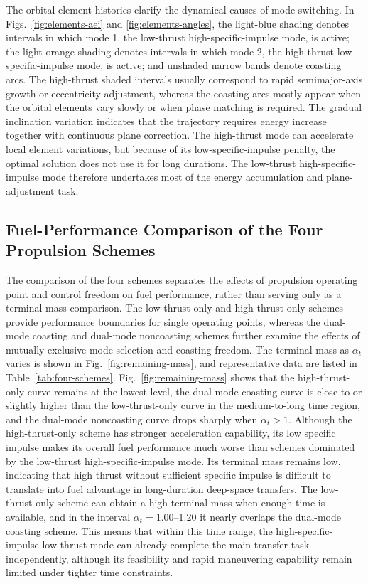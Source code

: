 ﻿\documentclass{IEEEtaes}
\begin{document}
The orbital-element histories clarify the dynamical causes of mode switching. In Figs.~\ref{fig:elements-aei} and \ref{fig:elements-angles}, the light-blue shading denotes intervals in which mode 1, the low-thrust high-specific-impulse mode, is active; the light-orange shading denotes intervals in which mode 2, the high-thrust low-specific-impulse mode, is active; and unshaded narrow bands denote coasting arcs. The high-thrust shaded intervals usually correspond to rapid semimajor-axis growth or eccentricity adjustment, whereas the coasting arcs mostly appear when the orbital elements vary slowly or when phase matching is required. The gradual inclination variation indicates that the trajectory requires energy increase together with continuous plane correction. The high-thrust mode can accelerate local element variations, but because of its low-specific-impulse penalty, the optimal solution does not use it for long durations. The low-thrust high-specific-impulse mode therefore undertakes most of the energy accumulation and plane-adjustment task.

\subsection{Fuel-Performance Comparison of the Four Propulsion Schemes}
The comparison of the four schemes separates the effects of propulsion operating point and control freedom on fuel performance, rather than serving only as a terminal-mass comparison. The low-thrust-only and high-thrust-only schemes provide performance boundaries for single operating points, whereas the dual-mode coasting and dual-mode noncoasting schemes further examine the effects of mutually exclusive mode selection and coasting freedom. The terminal mass as $\alpha_t$ varies is shown in Fig.~\ref{fig:remaining-mass}, and representative data are listed in Table~\ref{tab:four-schemes}. Fig.~\ref{fig:remaining-mass} shows that the high-thrust-only curve remains at the lowest level, the dual-mode coasting curve is close to or slightly higher than the low-thrust-only curve in the medium-to-long time region, and the dual-mode noncoasting curve drops sharply when $\alpha_t>1$. Although the high-thrust-only scheme has stronger acceleration capability, its low specific impulse makes its overall fuel performance much worse than schemes dominated by the low-thrust high-specific-impulse mode. Its terminal mass remains low, indicating that high thrust without sufficient specific impulse is difficult to translate into fuel advantage in long-duration deep-space transfers. The low-thrust-only scheme can obtain a high terminal mass when enough time is available, and in the interval $\alpha_t=1.00$--1.20 it nearly overlaps the dual-mode coasting scheme. This means that within this time range, the high-specific-impulse low-thrust mode can already complete the main transfer task independently, although its feasibility and rapid maneuvering capability remain limited under tighter time constraints.
\end{document}
